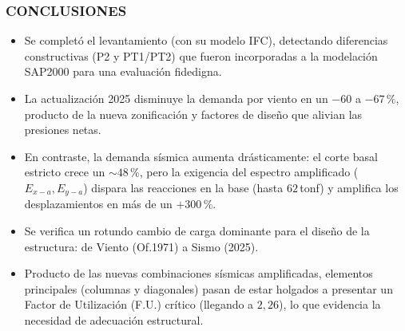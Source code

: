 \documentclass[11.5pt,aspectratio=169,handout]{beamer}
\newcommand{\ctitle}[1]{\frametitle{#1}}
\begin{document}
\begin{frame}
\ctitle{CONCLUSIONES}
\vspace{2mm}
\begin{itemize}\footnotesize\setlength{\itemsep}{3mm}
  \item Se completó el \alert{levantamiento} (con su modelo IFC), detectando diferencias constructivas (P2 y PT1/PT2) que fueron incorporadas a la \alert{modelación SAP2000} para una evaluación fidedigna.
  \item La actualización 2025 \alert{disminuye la demanda por viento} en un $-60$ a $-67\,\text{\%}$, producto de la nueva zonificación y factores de diseño que alivian las presiones netas.
  \item En contraste, la \alert{demanda sísmica aumenta drásticamente}: el corte basal estricto crece un ${\sim}48\,\text{\%}$, pero la exigencia del \alert{espectro amplificado} ($E_{x-a}, E_{y-a}$) dispara las reacciones en la base (hasta $62$\,tonf) y amplifica los desplazamientos en más de un $+300\,\text{\%}$.
  \item Se verifica un rotundo \alert{cambio de carga dominante} para el diseño de la estructura: de Viento (Of.1971) a Sismo (2025).
  \item Producto de las nuevas combinaciones sísmicas amplificadas, elementos principales (columnas y diagonales) pasan de estar holgados a presentar un \alert{Factor de Utilización (F.U.) crítico} (llegando a $2{,}26$), lo que evidencia la necesidad de \alert{adecuación estructural}.
\end{itemize}
\end{frame}

\end{document}
